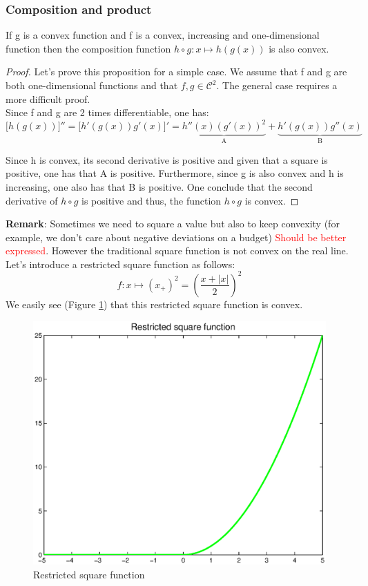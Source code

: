 \subsubsection{Composition and product}
\begin{property}
If g is a convex function and f is a convex, increasing and one-dimensional function then the composition function $h \circ g: x \mapsto h(g(x))$ is also convex. 
\end{property}
\begin{proof}
Let's prove this proposition for a simple case. We assume that f and g are both one-dimensional functions and that $f,g \in \mathcal{C}^2$. The general case requires a more difficult proof. \\
Since f and g are 2 times differentiable, one has:
$$\big[ h(g(x))\big]'' = \big[ h'(g(x))g'(x)\big]' = \underbrace{h''(x)(g'(x))^2}_\text{A} + \underbrace{h'(g(x))g''(x)}_\text{B} $$

Since h is convex, its second derivative is positive and given that a square is positive, one has that A is positive. Furthermore, since g is also convex and h is increasing, one also has that B is positive. One conclude that the second derivative of $h \circ g$ is positive and thus, the function $h \circ g$ is convex. 
\end{proof}
\textbf{Remark}: Sometimes we need to square a value but also to keep convexity (for example, we don't care about negative deviations on a budget) \textcolor{red}{Should be better expressed}. However the traditional square function is not convex on the real line. Let's introduce a restricted square function as follows: 
$$f: x \mapsto (x_+)^2 = (\frac{x + |x|}{2})^2$$
We easily see (Figure \ref{restricted}) that this restricted square function is convex.

\begin{figure}[H]
\begin{center}
\includegraphics[scale=0.5]{./images/Course4_restrictedsquare.eps}
\caption{Restricted square function}
\label{restricted}
\end{center}
\end{figure}

